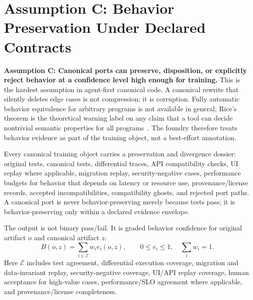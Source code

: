 \section{Assumption C: Behavior Preservation Under Declared Contracts}

\textbf{Assumption C: Canonical ports can preserve, disposition, or explicitly reject behavior at a confidence level high enough for training.} This is the hardest assumption in agent-first canonical code. A canonical rewrite that silently deletes edge cases is not compression; it is corruption. Fully automatic behavior equivalence for arbitrary programs is not available in general; Rice's theorem is the theoretical warning label on any claim that a tool can decide nontrivial semantic properties for all programs~\cite{riceTheoremMIT}. The foundry therefore treats behavior evidence as part of the training object, not a best-effort annotation.

Every canonical training object carries a preservation and divergence dossier: original tests, canonical tests, differential traces, API compatibility checks, UI replay where applicable, migration replay, security-negative cases, performance budgets for behavior that depends on latency or resource use, provenance/license records, accepted incompatibilities, compatibility ghosts, and rejected port paths. A canonical port is never behavior-preserving merely because tests pass; it is behavior-preserving only within a declared evidence envelope.

The output is not binary pass/fail. It is graded behavior confidence for original artifact $o$ and canonical artifact $z$:
\begin{equation}
  B(o,z)=\sum_{i\in\mathcal{E}} w_i e_i(o,z),
  \qquad 0\le e_i\le 1,\quad \sum_i w_i=1.
\end{equation}
Here $\mathcal{E}$ includes test agreement, differential execution coverage, migration and data-invariant replay, security-negative coverage, UI/API replay coverage, human acceptance for high-value cases, performance/SLO agreement where applicable, and provenance/license completeness.

